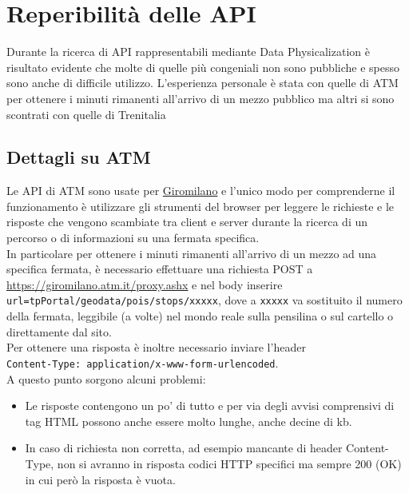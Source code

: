 \documentclass[12pt,a4paper]{report}
\begin{document}


\section{Reperibilità delle API}
Durante la ricerca di API rappresentabili mediante Data Physicalization è risultato evidente che molte di quelle più congeniali non
sono pubbliche e spesso sono anche di difficile utilizzo. L'esperienza personale è stata con quelle di ATM per ottenere i minuti rimanenti
all'arrivo di un mezzo pubblico ma altri si sono scontrati con quelle di Trenitalia \cite{trenitaliashock}

\subsection{Dettagli su ATM}
Le API di ATM sono usate per \href{https://giromilano.atm.it}{Giromilano} e l'unico modo per comprenderne il funzionamento è utilizzare
gli strumenti del browser per leggere le richieste e le risposte che vengono scambiate tra client e server durante la ricerca di un
percorso o di informazioni su una fermata specifica.\\
In particolare per ottenere i minuti rimanenti all'arrivo di un mezzo ad una specifica fermata, è necessario effettuare una richiesta
POST a\\ \url{https://giromilano.atm.it/proxy.ashx} e nel body inserire\\ \texttt{url=tpPortal/geodata/pois/stops/xxxxx}, dove a
\texttt{xxxxx} va sostituito il numero della fermata, leggibile (a volte) nel mondo reale sulla pensilina o sul cartello o direttamente
dal sito.\\
Per ottenere una risposta è inoltre necessario inviare l'header\\ \texttt{Content-Type: application/x-www-form-urlencoded}.\\
A questo punto sorgono alcuni problemi:
\begin{itemize}
  \item Le risposte contengono un po' di tutto e per via degli avvisi comprensivi di tag HTML possono anche essere molto lunghe, anche
        decine di kb.
  \item In caso di richiesta non corretta, ad esempio mancante di header Content-Type, non si avranno in risposta codici HTTP specifici
        ma sempre 200 (OK) in cui però la risposta è vuota.
\end{itemize}
\end{document}
